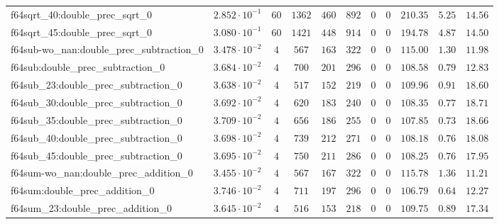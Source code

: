 \begin{tabular}{|l|c|c|c|c|c|c|c|c|c|c|}
f64sqrt\_40:double\_prec\_sqrt\_0              & $ 2.852 \cdot 10^{-1} $ & $ 60     $ & $ 1362   $ & $ 460   $ & $ 892   $ & $ 0   $ & $ 0 $ & $ 210.35      $ & $ 5.25    $ & $ 14.56   $ \\
f64sqrt\_45:double\_prec\_sqrt\_0              & $ 3.080 \cdot 10^{-1} $ & $ 60     $ & $ 1421   $ & $ 448   $ & $ 914   $ & $ 0   $ & $ 0 $ & $ 194.78      $ & $ 4.87    $ & $ 14.50   $ \\
f64sub-wo\_nan:double\_prec\_subtraction\_0    & $ 3.478 \cdot 10^{-2} $ & $ 4      $ & $ 567    $ & $ 163   $ & $ 322   $ & $ 0   $ & $ 0 $ & $ 115.00      $ & $ 1.30    $ & $ 11.98   $ \\
f64sub:double\_prec\_subtraction\_0            & $ 3.684 \cdot 10^{-2} $ & $ 4      $ & $ 700    $ & $ 201   $ & $ 296   $ & $ 0   $ & $ 0 $ & $ 108.58      $ & $ 0.79    $ & $ 12.83   $ \\
f64sub\_23:double\_prec\_subtraction\_0        & $ 3.638 \cdot 10^{-2} $ & $ 4      $ & $ 517    $ & $ 152   $ & $ 219   $ & $ 0   $ & $ 0 $ & $ 109.96      $ & $ 0.91    $ & $ 18.60   $ \\
f64sub\_30:double\_prec\_subtraction\_0        & $ 3.692 \cdot 10^{-2} $ & $ 4      $ & $ 620    $ & $ 183   $ & $ 240   $ & $ 0   $ & $ 0 $ & $ 108.35      $ & $ 0.77    $ & $ 18.71   $ \\
f64sub\_35:double\_prec\_subtraction\_0        & $ 3.709 \cdot 10^{-2} $ & $ 4      $ & $ 656    $ & $ 186   $ & $ 255   $ & $ 0   $ & $ 0 $ & $ 107.85      $ & $ 0.73    $ & $ 18.66   $ \\
f64sub\_40:double\_prec\_subtraction\_0        & $ 3.698 \cdot 10^{-2} $ & $ 4      $ & $ 739    $ & $ 212   $ & $ 271   $ & $ 0   $ & $ 0 $ & $ 108.18      $ & $ 0.76    $ & $ 18.08   $ \\
f64sub\_45:double\_prec\_subtraction\_0        & $ 3.695 \cdot 10^{-2} $ & $ 4      $ & $ 750    $ & $ 211   $ & $ 286   $ & $ 0   $ & $ 0 $ & $ 108.25      $ & $ 0.76    $ & $ 17.95   $ \\
f64sum-wo\_nan:double\_prec\_addition\_0       & $ 3.455 \cdot 10^{-2} $ & $ 4      $ & $ 567    $ & $ 167   $ & $ 322   $ & $ 0   $ & $ 0 $ & $ 115.78      $ & $ 1.36    $ & $ 11.21   $ \\
f64sum:double\_prec\_addition\_0               & $ 3.746 \cdot 10^{-2} $ & $ 4      $ & $ 711    $ & $ 197   $ & $ 296   $ & $ 0   $ & $ 0 $ & $ 106.79      $ & $ 0.64    $ & $ 12.27   $ \\
f64sum\_23:double\_prec\_addition\_0           & $ 3.645 \cdot 10^{-2} $ & $ 4      $ & $ 516    $ & $ 153   $ & $ 218   $ & $ 0   $ & $ 0 $ & $ 109.75      $ & $ 0.89    $ & $ 17.34   $ \\

\end{tabular}
